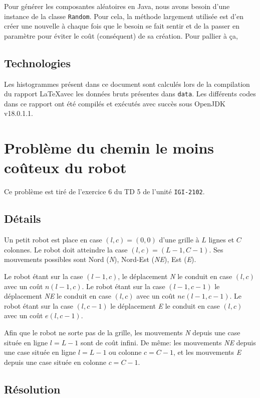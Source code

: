 \documentclass[a4paper,english,french]{article}
\begin{document}
Pour générer les composantes aléatoires en Java, nous avons besoin d'une instance de la classe \texttt{Random}. Pour cela, la méthode largement utilisée est d'en créer une nouvelle à chaque fois que le besoin se fait sentir et de la passer en paramètre pour éviter le coût (conséquent) de sa création. Pour pallier à ça,

\subsection*{Technologies}

Les histogrammes présent dans ce document sont calculés lors de la compilation du rapport \LaTeX avec les données bruts présentes dans \texttt{data}.
Les différents codes dans ce rapport ont été compilés et exécutés avec succès sous OpenJDK v18.0.1.1.

\section{Problème du chemin le moins coûteux du robot}

Ce problème est tiré de l'exercice 6 du TD 5 de l'unité \texttt{IGI-2102}.

\subsection*{Détails}

Un petit robot est place en case  $(l,c) = (0,0)$ d'une grille à $L$ lignes et $C$ colonnes. Le
robot doit atteindre la case $(l,c) = (L - 1,C - 1)$. Ses mouvements possibles sont Nord (\textit{N}), Nord-Est (\textit{NE}),
Est (\textit{E}).

Le robot étant sur la case $(l - 1,c)$, le déplacement  \textit{N} le conduit en case $(l,c)$ avec un coût $n(l - 1,c)$.
Le robot étant sur la case $(l - 1,c - 1)$ le déplacement \textit{NE} le conduit en case $(l,c)$ avec un coût $ne(l - 1,c - 1)$.
Le robot étant sur la case $(l,c - 1)$ le déplacement \textit{E} le conduit en case $(l,c)$ avec un coût $e(l,c - 1)$.

Afin que le robot ne sorte pas de la grille, les mouvements \textit{N} depuis une case située en ligne $l = L - 1$ sont de
coût infini. De même: les mouvements \textit{NE} depuis une case située en ligne $l = L - 1$ ou colonne $c = C - 1$,
et les mouvements \textit{E} depuis une case située en colonne $c = C - 1$.

\subsection*{Résolution}
\end{document}
